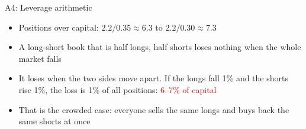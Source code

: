 \documentclass[aspectratio=169,10pt]{beamer}
\begin{document}
\begin{frame}[label=appendix_lev]{A4: Leverage arithmetic}
\begin{itemize}
\item Positions over capital: $2.2 / 0.35 \approx 6.3$ \quad to \quad $2.2 / 0.30 \approx 7.3$
\vskip 6pt
\item A long-short book that is half longs, half shorts loses nothing when the whole market falls
\vskip 6pt
\item It loses when the two sides move apart. If the longs fall 1\% and the shorts rise 1\%, the loss is 1\% of all positions: \textcolor{red}{6--7\% of capital}
\vskip 6pt
\item That is the crowded case: everyone sells the same longs and buys back the same shorts at once
\end{itemize}
\vskip 5pt
\hfill \hyperlink{q7}{}
\end{frame}
\end{document}
